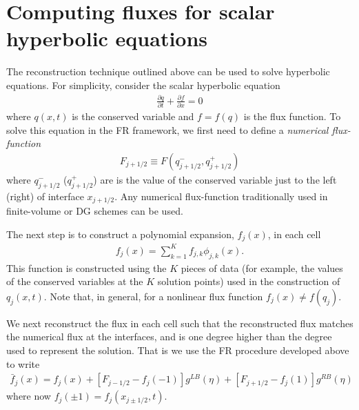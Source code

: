 \documentclass[11pt, reqno]{amsart}
\newcommand{\pfrac}[2]{\frac{\partial #1}{\partial #2}}
\theoremstyle{definition}
\begin{document}
\section{Computing fluxes for scalar hyperbolic equations}

The reconstruction technique outlined above can be used to solve
hyperbolic equations. For simplicity, consider the scalar hyperbolic
equation
\begin{align}
  \pfrac{q}{t} + \pfrac{f}{x} = 0
\end{align}
where $q(x,t)$ is the conserved variable and $f = f(q)$ is the flux
function. To solve this equation in the FR framework, we first need to
define a \emph{numerical flux-function}
\begin{align}
  F_{j+1/2} \equiv F(q^-_{j+1/2},q^+_{j+1/2})
\end{align}
where $q^-_{j+1/2}$ ($q^+_{j+1/2}$) are is the value of the conserved
variable just to the left (right) of interface $x_{j+1/2}$. Any
numerical flux-function traditionally used in finite-volume or DG
schemes can be used.

The next step is to construct a polynomial expansion, $f_j(x)$, in
each cell
\begin{align}
  f_j(x) = \sum_{k=1}^K f_{j,k} \phi_{j,k}(x).
\end{align}
This function is constructed using the $K$ pieces of data (for
example, the values of the conserved variables at the $K$ solution
points) used in the construction of $q_j(x,t)$. Note that, in general,
for a nonlinear flux function $f_j(x) \ne f(q_j)$.

We next reconstruct the flux in each cell such that the reconstructed
flux matches the numerical flux at the interfaces, and is one degree
higher than the degree used to represent the solution. That is we
use the FR procedure developed above to write
\begin{align}\label{eq:flux_recon}
  \bar{f}_j(x)
  =
  f_j(x)
  +
  [F_{j-1/2} - f_j(-1)]g^{LB}(\eta)
  +
  [F_{j+1/2} - f_j(1)]g^{RB}(\eta)
\end{align}
where now $f_j(\pm 1) = f_j(x_{j\pm 1/2},t)$.
\end{document}
